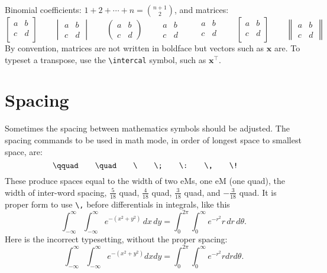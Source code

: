 \documentclass{article}
\begin{document}
Binomial coefficients:
\({\displaystyle 1 + 2 + \cdots + n = \binom{n+1}{2}}\), and matrices:
\begin{equation*}
  \begin{bmatrix}
    a & b \\
    c & d \\
  \end{bmatrix}
  \qquad
  \begin{vmatrix}
    a & b \\
    c & d
  \end{vmatrix}
  \qquad
  \begin{pmatrix}
    a & b \\
    c & d
  \end{pmatrix}
  \qquad
  \begin{matrix}
    a & b \\
    c & d
  \end{matrix}
  \qquad
  \begin{smallmatrix}
    a & b \\
    c & d \\
  \end{smallmatrix}
  \qquad
  \left[
  \begin{smallmatrix}
    a & b \\
    c & d \\
  \end{smallmatrix}
  \right]
  \qquad
  \begin{Vmatrix}
    a & b \\
    c & d
  \end{Vmatrix}
\end{equation*}
By convention, matrices are not written in boldface but vectors such as
\(\mathbf{x}\) are.  To typeset a transpose, use the \verb~\intercal~ symbol, such as
\(\mathbf{x}^\intercal\).

\section{Spacing}

Sometimes the spacing between mathematics symbols should be adjusted.  The
spacing commands to be used in math mode, in order of longest space to smallest
space, are:
\[
  \verb~\qquad~ \qquad
  \verb~\quad~  \qquad
  \verb~\~      \qquad
  \verb~\;~     \qquad
  \verb~\:~     \qquad
  \verb~\,~     \qquad
  \verb~\!~     \qquad
\]
These produce spaces equal to the width of two eMs, one eM (one quad), the
width of inter-word spacing, \(\frac{5}{18}\) quad, \(\frac{4}{18}\) quad,
\(\frac{3}{18}\) quad, and \(-\frac{3}{18}\) quad.  It is proper form to use
\verb~\,~ before differentials in integrals, like this
\[
  \int_{-\infty}^\infty \int_{-\infty}^\infty e^{-(x^2+y^2)} \, dx \, dy
  = \int_0^{2 \pi} \int_0^\infty e^{-r^2} r \, dr \, d\theta.
\]
Here is the incorrect typesetting, without the proper spacing:
\[
  \int_{-\infty}^\infty \int_{-\infty}^\infty e^{-(x^2+y^2)}  dx  dy
  = \int_0^{2 \pi} \int_0^\infty e^{-r^2} r dr d\theta.
\]
\end{document}
